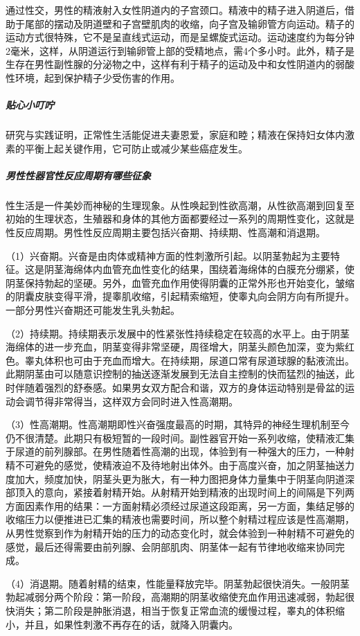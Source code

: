 通过性交，男性的精液射入女性阴道内的子宫颈口。精液中的精子进入阴道后，借助于尾部的摆动及阴道壁和子宫壁肌肉的收缩，向子宫及输卵管方向运动。精子的运动方式很特殊，它不是呈直线式运动，而是呈螺旋式运动。运动速度约为每分钟2毫米，这样，从阴道运行到输卵管上部的受精地点，需4个多小时。此外，精子是生存在男性副性腺的分泌物之中，这样有利于精子的运动及中和女性阴道内的弱酸性环境，起到保护精子少受伤害的作用。

\subparagraph{贴心小叮咛}

研究与实践证明，正常性生活能促进夫妻恩爱，家庭和睦；精液在保持妇女体内激素的平衡上起关键作用，它可防止或减少某些癌症发生。

\subparagraph{男性性器官性反应周期有哪些征象}

性生活是一件美妙而神秘的生理现象。从性唤起到性欲高潮，从性欲高潮到回复至初始的生理状态，生殖器和身体的其他方面都要经过一系列的周期性变化，这就是性反应周期。男性性反应周期主要包括兴奋期、持续期、性高潮和消退期。

（1）兴奋期。兴奋是由肉体或精神方面的性刺激所引起。以阴茎勃起为主要特征。这是阴茎海绵体内血管充血性变化的结果，围绕着海绵体的白膜充分绷紧，使阴茎保持勃起的坚硬。另外，血管充血作用使得阴囊的正常外形也开始变化，皱缩的阴囊皮肤变得平滑，提睾肌收缩，引起精索缩短，使睾丸向会阴方向有所提升。一部分男性兴奋期还可能发生乳头勃起。

（2）持续期。持续期表示发展中的性紧张性持续稳定在较高的水平上。由于阴茎海绵体的进一步充血，阴茎变得非常坚硬，周径增大，阴茎头颜色加深，变为紫红色。睾丸体积也可由于充血而增大。在持续期，尿道口常有尿道球腺的黏液流出。此期阴茎由可以随意识控制的抽送逐渐发展到无法自主控制的快而猛烈的抽送，此时伴随着强烈的舒泰感。如果男女双方配合和谐，双方的身体运动特别是骨盆的运动会调节得非常得当，这样双方会同时进入性高潮期。

（3）性高潮期。性高潮期即性兴奋强度最高的时期，其特异的神经生理机制至今仍不很清楚。此期只有极短暂的一段时间。副性器官开始一系列收缩，使精液汇集于尿道的前列腺部。在男性随着性高潮的出现，体验到有一种强大的压力，一种射精不可避免的感觉，使精液迫不及待地射出体外。由于高度兴奋，加之阴茎抽送力度加大，频度加快，阴茎头更为胀大，有一种力图把身体力量集中于阴茎向阴道深部顶入的意向，紧接着射精开始。从射精开始到精液的出现时间上的间隔是下列两方面因素作用的结果：一方面射精必须经过尿道这段距离，另一方面，集结足够的收缩压力以便推进已汇集的精液也需要时间，所以整个射精过程应该是性高潮期，从男性觉察到作为射精开始的压力的动态变化时，就会体验到一种射精不可避免的感觉，最后还得需要由前列腺、会阴部肌肉、阴茎体一起有节律地收缩来协同完成。

（4）消退期。随着射精的结束，性能量释放完毕。阴茎勃起很快消失。一般阴茎勃起减弱分两个阶段：第一阶段，高潮期的阴茎收缩使充血作用迅速减弱，勃起很快消失；第二阶段是肿胀消退，相当于恢复正常血流的缓慢过程，睾丸的体积缩小，并且，如果性刺激不再存在的话，就降入阴囊内。

